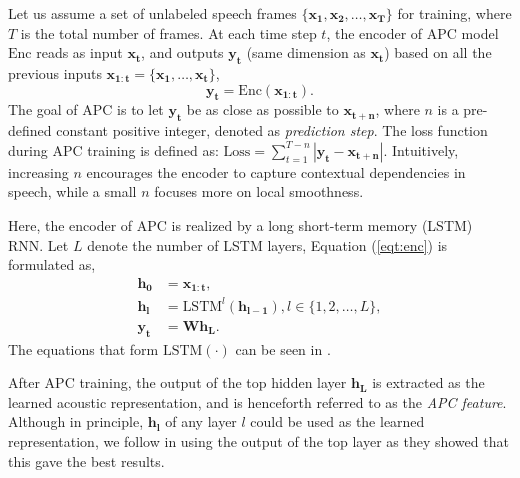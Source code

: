\documentclass[a4paper]{article}
\begin{document}
Let us assume a set of unlabeled speech frames $\{\bm{x_1}, \bm{x_2}, \ldots, \bm{x_T}\}$ for training, where $T$ is the total number of frames. At each time step $t$, the encoder of APC model $\textrm{Enc}$ reads as input
$\bm{x_t}$, 
and outputs $\bm{y_t}$ (same dimension as $\bm{x_t}$) based on all the previous inputs $\bm{x_{1:t}}=\{\bm{x_1},\ldots,\bm{x_t}\}$,
\begin{equation}
    \bm{y_t} = \textrm{Enc} (\bm{x_{1:t}}).
    \label{eqt:enc}
\end{equation}
The goal of APC is to let $\bm{y_t}$ be as close as possible to $\bm{x_{t+n}}$, where $n$ is a pre-defined constant positive integer, denoted as \textit{prediction step}. 
The loss function during APC   training is defined as: $\textrm{Loss} = \sum_{t=1}^{T-n} \left| \bm{y_t} - \bm{x_{t+n}} \right|$.
Intuitively, increasing $n$ encourages the   encoder to capture contextual dependencies in speech, 
while a small $n$ focuses more on local smoothness.
 
Here, the encoder of APC is realized by a long short-term memory (LSTM) \cite{hochreiter1997long} RNN. Let $L$ denote the number of LSTM layers,  Equation (\ref{eqt:enc}) is formulated as,
\begin{align}
    \bm{h_0} &= \bm{x_{1:t}},    \\
    \bm{h_l} &= \textrm{LSTM}^l (\bm{h_{l-1}}), l\in \{1,2,\ldots, L\}, \\
    \bm{y_t} &= \bm{W} \bm{h_L}.
\end{align}
The equations that form  $\textrm{LSTM} (\cdot)$ can be seen in \cite{sak2014long}.

After APC training, the output of the top hidden layer $\bm{h_L}$ is extracted as the  learned acoustic representation, and is henceforth referred to as the  \textit{APC feature}. 
Although in principle,  $\bm{h_l}$ of any layer $l$ could be used as the learned representation, 
we follow \cite{Chung2019} in using the output of the top layer as they showed that this gave the best results.
\end{document}
